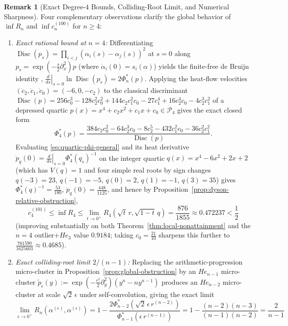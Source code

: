 \documentclass[11pt,a4paper]{article}
\theoremstyle{definition}
\newtheorem{remark}[theorem]{Remark}
\begin{document}
\begin{remark}[Exact Degree-$4$ Bounds, Colliding-Root Limit, and Numerical Sharpness]
\label{rem:global-sharpness}
Four complementary observations clarify the global behavior of $\inf R_n$ and $\inf c_n^{(100)}$ for $n \ge 4$:
\begin{enumerate}
\item[(i)] \emph{Exact rational bound at $n = 4$:} Differentiating $\operatorname{Disc}(p_s) = \prod_{i<j}(\alpha_i(s) - \alpha_j(s))^2$ at $s = 0$ along $p_s = \exp(-\frac{s}{2}\partial_x^2)p$ (where $\dot{\alpha}_i(0) = s_i(\alpha)$) yields the finite-free de Bruijn identity \cite[Lemma~6.1]{GSS2026}, $\left.\frac{d}{ds}\right|_{s=0} \ln\operatorname{Disc}(p_s) = 2\Phi_n^*(p)$. Applying the heat-flow velocities $(\dot{c}_2, \dot{c}_1, \dot{c}_0) = (-6, 0, -c_2)$ to the classical discriminant $\operatorname{Disc}(p) = 256 c_0^3 - 128 c_2^2 c_0^2 + 144 c_2 c_1^2 c_0 - 27 c_1^4 + 16 c_2^4 c_0 - 4 c_2^3 c_1^2$ of a depressed quartic $p(x) = x^4 + c_2 x^2 + c_1 x + c_0 \in \mathcal{P}_4$ gives the exact closed form
\begin{equation}
\label{eq:quartic-phi-general}
\Phi_4^*(p) = \frac{384 c_2 c_0^2 - 64 c_2^3 c_0 - 8 c_2^5 - 432 c_1^2 c_0 - 36 c_2^2 c_1^2}{\operatorname{Disc}(p)}.
\end{equation}
Evaluating \eqref{eq:quartic-phi-general} and its heat derivative $\dot{p}_q(0) = \left.\frac{d}{ds}\right|_{s=0}\Phi_4^*(q_s)^{-1}$ on the integer quartic $q(x) = x^4 - 6x^2 + 2x + 2$ (which has $V(q) = 1$ and four simple real roots by sign changes $q(-3)=23$, $q(-1)=-5$, $q(0)=2$, $q(1)=-1$, $q(3)=35$) gives $\Phi_4^*(q)^{-1} = \frac{53}{180}$, $\dot{p}_q(0) = \frac{448}{1125}$, and hence by Proposition~\ref{prop:dyson-relative-obstruction},
\[
c_4^{(101)} \le \inf R_4 \le \lim_{t \to 0^+} R_4(\sqrt{t}\,r, \sqrt{1-t}\,q) = \frac{876}{1855} \approx 0.472237 < \frac{1}{2}
\]
(improving substantially on both Theorem~\ref{thm:local-nonattainment} and the $n=4$ outlier+$He_3$ value $0.9184$; taking $c_0 = \frac{21}{10}$ sharpens this further to $\frac{761590}{1625603} \approx 0.4685$).
\item[(ii)] \emph{Exact colliding-root limit $2/(n-1)$:} Replacing the arithmetic-progression micro-cluster in Proposition~\ref{prop:global-obstruction} by an $He_{n-1}$ micro-cluster $\tilde{p}_\epsilon(y) := \exp(-\frac{\epsilon^2}{2}\partial_y^2)(y^n - n y^{n-1})$ produces an $He_{n-2}$ micro-cluster at scale $\sqrt{2}\,\epsilon$ under self-convolution, giving the exact limit
\[
\lim_{\epsilon \to 0^+} R_n(\alpha^{(\epsilon)}, \alpha^{(\epsilon)}) = 1 - \frac{2\Phi_{n-2}^*(\sqrt{2}\,\epsilon\,r^{(n-2)})}{\Phi_{n-1}^*(\epsilon\,r^{(n-1)})} = 1 - \frac{(n-2)(n-3)}{(n-1)(n-2)} = \frac{2}{n-1}
\]
\end{enumerate}
\end{remark}
\end{document}
